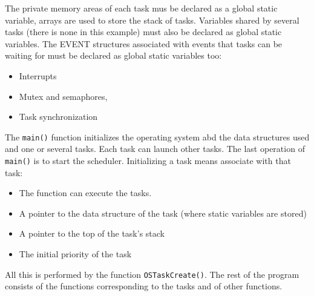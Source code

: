 \documentclass[../main.tex]{subfiles}
\begin{document}


The private memory areas of each task mus be declared as a global static variable, arrays are used to store the stack of tasks. Variables shared by several tasks (there is none in this example) must also be declared as global static variables. The EVENT structures associated with events that tasks can be waiting for must be declared as global static variables too:
\begin{itemize}
	\item Interrupts
	\item Mutex and semaphores,
	\item Task synchronization
\end{itemize}
The \texttt{main()} function initializes the operating system abd the data structures used and one or several tasks. Each task can launch other tasks. The last operation of \texttt{main()} is to start the scheduler. Initializing a task means associate with that task:
\begin{itemize}
	\item The function can execute the tasks.
	\item A pointer to the data structure of the task (where static variables are stored)
	\item A pointer to the top of the task's stack
	\item The initial priority of the task
\end{itemize}
All this is performed by the function \texttt{OSTaskCreate()}. The rest of the program consists of the functions corresponding to the tasks and of other functions.
\end{document}
